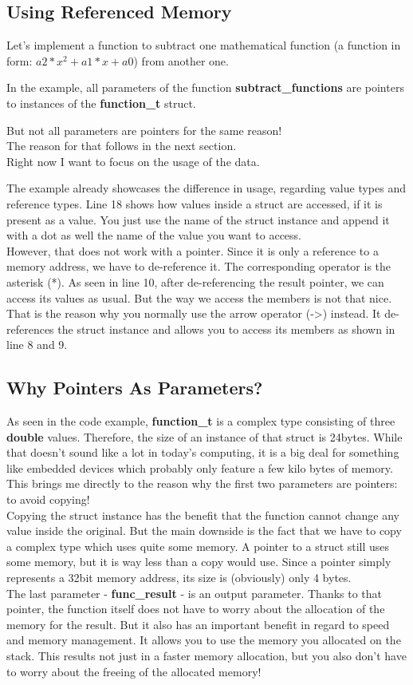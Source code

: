 \documentclass{article}
\begin{document}
  \subsection{Using Referenced Memory}
  Let's implement a function to subtract one mathematical function (a function in form: $a2 * x^2 + a1 * x + a0$) from another one.
  
  In the example, all parameters of the function \textbf{subtract\_functions} are pointers to instances of the \textbf{function\_t} struct.
  \begin{center}
    But not all parameters are pointers for the same reason!
    \\The reason for that follows in the next section.
    \\Right now I want to focus on the usage of the data.
  \end{center}
  The example already showcases the difference in usage, regarding value types and reference types.
  Line 18 shows how values inside a struct are accessed, if it is present as a value.
  You just use the name of the struct instance and append it with a dot as well the name of the value you want to access.
  \\However, that does not work with a pointer.
  Since it is only a reference to a memory address, we have to de-reference it.
  The corresponding operator is the asterisk (*).
  As seen in line 10, after de-referencing the result pointer, we can access its values as usual.
  But the way we access the members is not that nice.
  That is the reason why you normally use the arrow operator (->) instead.
  It de-references the struct instance and allows you to access its members as shown in line 8 and 9.
  \subsection{Why Pointers As Parameters?}
  As seen in the code example, \textbf{function\_t} is a complex type consisting of three \textbf{double} values.
  Therefore, the size of an instance of that struct is 24bytes.
  While that doesn't sound like a lot in today's computing, it is a big deal for something like embedded devices which probably only feature a few kilo bytes of memory.
  This brings me directly to the reason why the first two parameters are pointers: to avoid copying!
  \\Copying the struct instance has the benefit that the function cannot change any value inside the original.
  But the main downside is the fact that we have to copy a complex type which uses quite some memory.
  A pointer to a struct still uses some memory, but it is way less than a copy would use.
  Since a pointer simply represents a 32bit memory address, its size is (obviously) only 4 bytes.
  \\The last parameter - \textbf{func\_result} - is an output parameter.
  Thanks to that pointer, the function itself does not have to worry about the allocation of the memory for the result.
  But it also has an important benefit in regard to speed and memory management.
  It allows you to use the memory you allocated on the stack.
  This results not just in a faster memory allocation, but you also don't have to worry about the freeing of the allocated memory!
\end{document}
